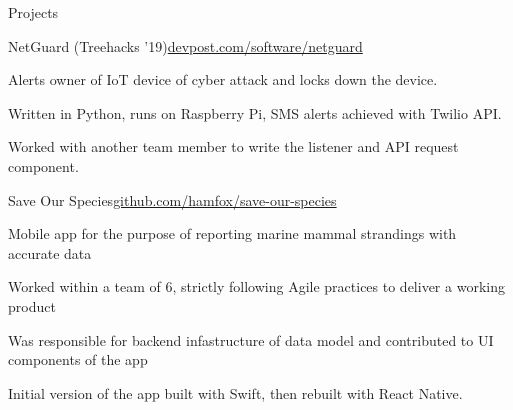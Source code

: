 \documentclass{resume} %
\begin{document}

\begin{rSection}{Projects}

\begin{rSubsection}{NetGuard (Treehacks '19)}{\href{https://www.devpost.com/software/netguard}{devpost.com/software/netguard}}{}{}
    \item Alerts owner of IoT device of cyber attack and locks down the device.
    \item Written in Python, runs on Raspberry Pi, SMS alerts achieved with Twilio API.
    \item Worked with another team member to write the listener and API request component.
\end{rSubsection}

\begin{rSubsection}{Save Our Species}{\href{https://github.com/hamfox/save-our-species}{github.com/hamfox/save-our-species}}{}{}
    \item Mobile app for the purpose of reporting marine mammal strandings with accurate data
    \item Worked within a team of 6, strictly following Agile practices to deliver a working product 
    \item Was responsible for backend infastructure of data model and contributed to UI components of the app
    \item Initial version of the app built with Swift, then rebuilt with React Native.
\end{rSubsection}

\end{rSection}




\end{document}
